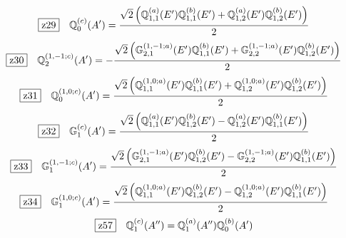 \documentclass[fleqn,10pt,landscape]{jsarticle}
\begin{document}
\begin{dmath*}
\hspace*{3mm}\fbox{z29}\quad \mathbb{Q}_{0}^{(c)}(A^{\prime})=\frac{\sqrt{2} \left(\mathbb{Q}_{1,1}^{(a)}(E^{\prime}) \mathbb{Q}_{1,1}^{(b)}(E^{\prime}) + \mathbb{Q}_{1,2}^{(a)}(E^{\prime}) \mathbb{Q}_{1,2}^{(b)}(E^{\prime})\right)}{2}
\end{dmath*}
\begin{dmath*}
\hspace*{3mm}\fbox{z30}\quad \mathbb{Q}_{2}^{(1,-1;c)}(A^{\prime})=- \frac{\sqrt{2} \left(\mathbb{G}_{2,1}^{(1,-1;a)}(E^{\prime}) \mathbb{Q}_{1,1}^{(b)}(E^{\prime}) + \mathbb{G}_{2,2}^{(1,-1;a)}(E^{\prime}) \mathbb{Q}_{1,2}^{(b)}(E^{\prime})\right)}{2}
\end{dmath*}
\begin{dmath*}
\hspace*{3mm}\fbox{z31}\quad \mathbb{Q}_{0}^{(1,0;c)}(A^{\prime})=\frac{\sqrt{2} \left(\mathbb{Q}_{1,1}^{(1,0;a)}(E^{\prime}) \mathbb{Q}_{1,1}^{(b)}(E^{\prime}) + \mathbb{Q}_{1,2}^{(1,0;a)}(E^{\prime}) \mathbb{Q}_{1,2}^{(b)}(E^{\prime})\right)}{2}
\end{dmath*}
\begin{dmath*}
\hspace*{3mm}\fbox{z32}\quad \mathbb{G}_{1}^{(c)}(A^{\prime})=\frac{\sqrt{2} \left(\mathbb{Q}_{1,1}^{(a)}(E^{\prime}) \mathbb{Q}_{1,2}^{(b)}(E^{\prime}) - \mathbb{Q}_{1,2}^{(a)}(E^{\prime}) \mathbb{Q}_{1,1}^{(b)}(E^{\prime})\right)}{2}
\end{dmath*}
\begin{dmath*}
\hspace*{3mm}\fbox{z33}\quad \mathbb{G}_{1}^{(1,-1;c)}(A^{\prime})=\frac{\sqrt{2} \left(\mathbb{G}_{2,1}^{(1,-1;a)}(E^{\prime}) \mathbb{Q}_{1,2}^{(b)}(E^{\prime}) - \mathbb{G}_{2,2}^{(1,-1;a)}(E^{\prime}) \mathbb{Q}_{1,1}^{(b)}(E^{\prime})\right)}{2}
\end{dmath*}
\begin{dmath*}
\hspace*{3mm}\fbox{z34}\quad \mathbb{G}_{1}^{(1,0;c)}(A^{\prime})=\frac{\sqrt{2} \left(\mathbb{Q}_{1,1}^{(1,0;a)}(E^{\prime}) \mathbb{Q}_{1,2}^{(b)}(E^{\prime}) - \mathbb{Q}_{1,2}^{(1,0;a)}(E^{\prime}) \mathbb{Q}_{1,1}^{(b)}(E^{\prime})\right)}{2}
\end{dmath*}
\begin{dmath*}
\hspace*{3mm}\fbox{z57}\quad \mathbb{Q}_{1}^{(c)}(A^{\prime\prime})=\mathbb{Q}_{1}^{(a)}(A^{\prime\prime}) \mathbb{Q}_{0}^{(b)}(A^{\prime})
\end{dmath*}
\end{document}
